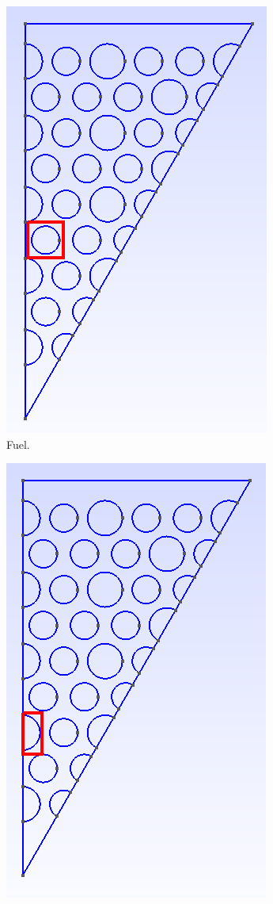 \documentclass[11pt,letterpaper]{article}
\begin{document}
	\begin{figure}[htbp!]
		\centering
		\begin{subfigure}[t]{0.4\textwidth}
			\centering
			\includegraphics[width=0.7\linewidth]{3D-assembly-detectorA}
			\caption{Fuel.}
		\end{subfigure}
		\begin{subfigure}[t]{0.4\textwidth}
			\centering
			\includegraphics[width=0.7\linewidth]{3D-assembly-detectorB}

\end{subfigure}
\end{figure}
\end{document}
